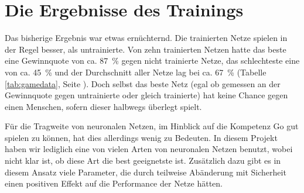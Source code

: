 \section{Die Ergebnisse des Trainings}
Das bisherige Ergebnis war etwas ernüchternd. Die trainierten Netze spielen in
der Regel besser, als untrainierte. Von zehn trainierten Netzen hatte das beste
eine Gewinnquote von ca. \SI{87}{\percent} gegen nicht trainierte Netze, das
schlechteste eine von ca. \SI{45}{\percent} und der Durchschnitt aller Netze
lag bei ca. \SI{67}{\percent} (Tabelle \ref{tab:gamedata}, Seite
\pageref{tab:gamedata}).  Doch selbst das beste Netz (egal ob gemessen an der
Gewinnquote gegen untrainierte oder gleich trainierte) hat keine Chance gegen
einen Menschen, sofern dieser halbwegs überlegt spielt.

Für die Tragweite von neuronalen Netzen, im Hinblick auf die Kompetenz Go gut
spielen zu können, hat dies allerdings wenig zu Bedeuten. In diesem Projekt
haben wir lediglich eine von vielen Arten von neuronalen Netzen benutzt, wobei
nicht klar ist, ob diese Art die best geeignetste ist. Zusätzlich dazu gibt es
in diesem Ansatz viele Parameter, die durch teilweise Abänderung mit Sicherheit
einen positiven Effekt auf die Performance der Netze hätten. 
